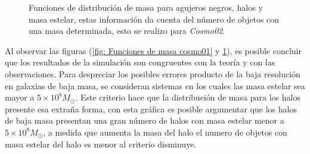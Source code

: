 \begin{figure}
\centering
{}
\caption{Funciones de distribución de masa para agujeros negros, halos y masa estelar, estas información da cuenta del número de objetos con una masa determinada, esto se realizo para {\it{Cosmo02}}.}
 \label{fig: Funciones de masa cosmo02}
\end{figure}
%
Al observar las figuras (\ref{fig: Funciones de masa cosmo01} y \ref{fig: Funciones de masa cosmo02}), es posible concluir que los resultados de la simulación son congruentes con la teoría y con las observaciones. Para despreciar los posibles errores producto de la baja resolución en galaxias de baja masa, se consideran sistemas en los cuales las masa estelar sea mayor a $5\times 10^{8}M_{\odot}$. Este criterio hace que la distribución de masa para los halos presente  esa extraña forma, con esta gráfica es posible argumentar que los halos de baja masa presentan una gran número de halos con masa estelar menor a $5\times 10^{8}M_{\odot}$, a medida que aumenta la masa del halo el numero de objetos con masa estelar del halo es menor al criterio disminuye. 


